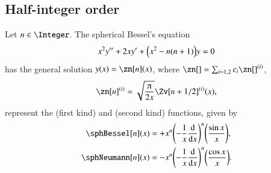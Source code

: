 

\subsection{Half-integer order}
    Let $n\in \Integer$. The spherical Bessel's equation
    \begin{equation}
        x^2 y'' + 2x y' + {\left(  x^2 - n(n+1)  \right)}y = 0
    \end{equation}
    has the general solution $y(x)=\zn[n](x)$, where $\zn[]=\sum_{i=1,2}c_i \zn[]^{(i)}$,
    \begin{equation}
        \zn[n]^{(i)} = \sqrt{\frac{\ppi}{2x}} \Zv[n+1/2]^{(i)}(x),
    \end{equation}
    represent the  (first kind) and  (second kind) functions, given by
    \begin{subequations}\label{eq:special:spherical_Bessel}
        \begin{align}
            \sphBessel[n](x) &= +x^n \pclosed{-\frac{1}{x} \dv{}{x}}^n \pclosed{ \frac{\sin{x}}{x}}  ,\\
            \sphNeumann[n](x) &= - x^n \pclosed{-\frac{1}{x} \dv{}{x}}^n \pclosed{ \frac{\cos{x}}{x}}.
        \end{align}
    \end{subequations}
